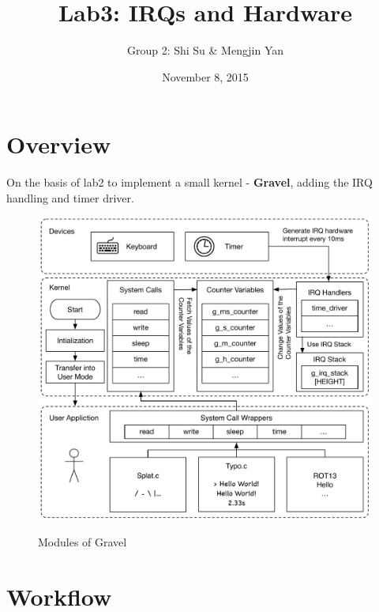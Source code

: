 \documentclass{article}
\title{\bf{ Lab3: IRQs and Hardware} }
\author{Group 2: Shi Su \& Mengjin Yan}
\date{November 8, 2015}
\begin{document}
 
\maketitle
 
\tableofcontents

\newpage

\section{Overview}
 
On the basis of lab2 to implement a small kernel - {\bf Gravel}, adding the IRQ handling and timer driver.\\
\newline
\begin{figure}[h]
\centering
  \includegraphics[scale=0.8]{workflow.pdf}\\
 \caption{Modules of Gravel}
 \end{figure}
  
\newpage
\section{Workflow}
\end{document}
